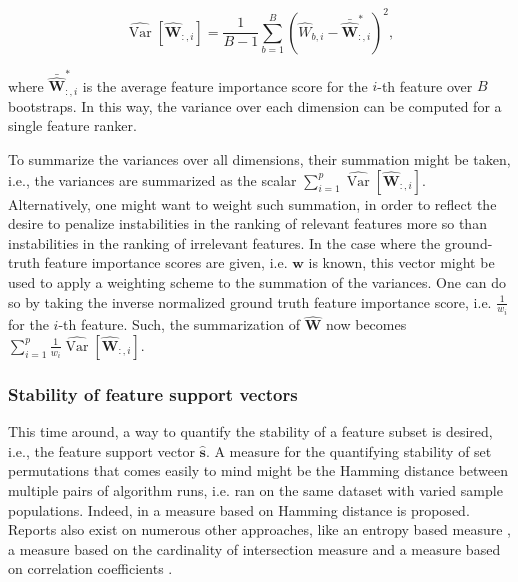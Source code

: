 \documentclass[../main.tex]{subfiles}
\begin{document}
\begin{equation}
\widehat{\operatorname{Var}}[\hat{\mathbf{W}}_{:,i}]=\frac{1}{B-1} \sum_{b=1}^{B}\left(\hat{W}_{b,i}-\bar{\hat{\mathbf{W}}}_{:,i}^{*}\right)^{2},
\end{equation}

where $\bar{\hat{\mathbf{W}}}_{:,i}^{*}$ is the average feature importance score for the $i$-th feature over $B$ bootstraps. In this way, the variance over each dimension can be computed for a single feature ranker.

To summarize the variances over all dimensions, their summation might be taken, i.e., the variances are summarized as the scalar $\sum_{i=1}^p \widehat{\operatorname{Var}}[\hat{\mathbf{W}}_{:,i}]$. Alternatively, one might want to weight such summation, in order to reflect the desire to penalize instabilities in the ranking of relevant features more so than instabilities in the ranking of irrelevant features. In the case where the ground-truth feature importance scores are given, i.e. $\boldsymbol{w}$ is known, this vector might be used to apply a weighting scheme to the summation of the variances. One can do so by taking the inverse normalized ground truth feature importance score, i.e. $\frac{1}{w_i}$ for the $i$-th feature. Such, the summarization of $\hat{\mathbf{W}}$ now becomes $\sum_{i=1}^p \frac{1}{w_i} \widehat{\operatorname{Var}}[\hat{\mathbf{W}}_{:,i}]$.



\subsubsection{Stability of feature support vectors}
This time around, a way to quantify the stability of a feature subset is desired, i.e., the feature support vector $\hat{\boldsymbol{s}}$. A measure for the quantifying stability of set permutations that comes easily to mind might be the Hamming distance between multiple pairs of algorithm runs, i.e. ran on the same dataset with varied sample populations. Indeed, in \citep{dunne_solutions_2002} a measure based on Hamming distance is proposed. Reports also exist on numerous other approaches, like an entropy based measure \citep{krizek_improving_2007}, a measure based on the cardinality of intersection measure \citep{kuncheva_stability_2007} and a measure based on correlation coefficients \citep{kalousis_stability_2007}.
\end{document}
